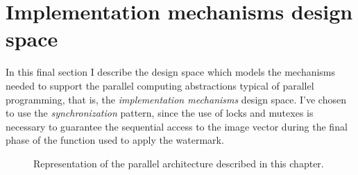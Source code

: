     \section{Implementation mechanisms design space} %
    \label{sec:implementation_mechanisms_design_space}
        In this final section I describe the design space which models the mechanisms needed to support the
        parallel computing abstractions typical of parallel programming, that is, the \textit{implementation
        mechanisms} design space. I've chosen to use the \textit{synchronization} pattern, since the use of locks
        and mutexes is necessary to guarantee the sequential access to the image vector during the final phase
        of the function used to apply the watermark.

        \begin{figure}[t]
        \centering
        \caption{Representation of the parallel architecture described in this chapter.}
        \label{fig:parallel_architecture}
        \end{figure}


